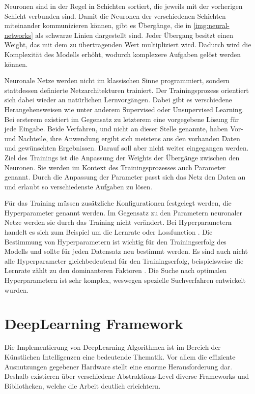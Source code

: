 Neuronen sind in der Regel in Schichten sortiert, die jeweils mit der vorherigen Schicht verbunden sind.
Damit die Neuronen der verschiedenen Schichten miteinander kommunizieren können, gibt es Übergänge, die in \cref{img:neural-networks} als schwarze Linien dargestellt sind.
Jeder Übergang besitzt einen Weight, das mit dem zu übertragenden Wert multipliziert wird.
Dadurch wird die Komplexität des Modells erhöht, wodurch komplexere Aufgaben gelöst werden können.
\newline

Neuronale Netze werden nicht im klassischen Sinne programmiert, sondern stattdessen definierte Netzarchitekturen trainiert.
Der Trainingsprozess orientiert sich dabei wieder an natürlichen Lernvorgängen.
Dabei gibt es verschiedene Herangehensweisen wie unter anderem Supervised oder Unsupervised Learning.
Bei ersterem existiert im Gegensatz zu letzterem eine vorgegebene Lösung für jede Eingabe.
Beide Verfahren, und nicht an dieser Stelle genannte, haben Vor- und Nachteile, ihre Anwendung ergibt sich meistens aus den vorhanden Daten und gewünschten Ergebnissen.
Darauf soll aber nicht weiter eingegangen werden.
Ziel des Trainings ist die Anpassung der Weights der Übergänge zwischen den Neuronen.
Sie werden im Kontext des Trainingsprozesses auch Parameter genannt.
Durch die Anpassung der Parameter passt sich das Netz den Daten an und erlaubt so verschiedenste Aufgaben zu lösen.
\newline

Für das Training müssen zusätzliche Konfigurationen festgelegt werden, die Hyperparameter genannt werden.
Im Gegensatz zu den Parametern neuronaler Netze werden sie durch das Training nicht verändert.
Bei Hyperparametern handelt es sich zum Beispiel um die Lernrate oder Lossfunction \cite{hyperparameters-gan-using-genetic-algorithm}.
Die Bestimmung von Hyperparametern ist wichtig für den Trainingserfolg des Modells und sollte für jeden Datensatz neu bestimmt werden.
Es sind auch nicht alle Hyperparameter gleichbedeutend für den Trainingserfolg, beispielsweise die Lernrate zählt zu den dominanteren Faktoren \cite{learning-rate-most-important}.
Die Suche nach optimalen Hyperparametern ist sehr komplex, weswegen spezielle Suchverfahren entwickelt wurden. 

\section{DeepLearning Framework}
Die Implementierung von DeepLearning-Algorithmen ist im Bereich der Künstlichen Intelligenzen eine bedeutende Thematik.
Vor allem die effiziente Ausnutzungen gegebener Hardware stellt eine enorme Herausforderung dar. 
Deshalb existieren über verschiedene Abstraktions-Level diverse Frameworks und Bibliotheken, welche die Arbeit deutlich erleichtern.
\newline


